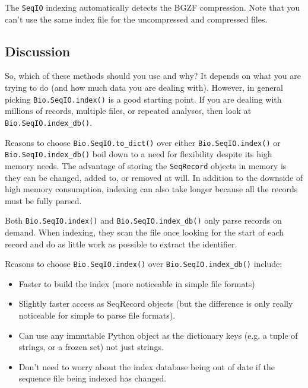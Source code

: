 The \verb|SeqIO| indexing automatically detects the BGZF compression. Note
that you can't use the same index file for the uncompressed and compressed files.

\subsection{Discussion}
\label{sec:SeqIO-indexing-discussion}

So, which of these methods should you use and why? It depends on what you are
trying to do (and how much data you are dealing with). However, in general
picking \verb|Bio.SeqIO.index()| is a good starting point. If you are dealing
with millions of records, multiple files, or repeated analyses, then look at
\verb|Bio.SeqIO.index_db()|.

Reasons to choose \verb|Bio.SeqIO.to_dict()| over either
\verb|Bio.SeqIO.index()| or \verb|Bio.SeqIO.index_db()| boil down to a need
for flexibility despite its high memory needs. The advantage of storing the
\verb|SeqRecord| objects in memory is they can be changed, added to, or
removed at will. In addition to the downside of high memory consumption,
indexing can also take longer because all the records must be fully parsed.

Both \verb|Bio.SeqIO.index()| and \verb|Bio.SeqIO.index_db()| only parse
records on demand. When indexing, they scan the file once looking for the
start of each record and do as little work as possible to extract the
identifier.

Reasons to choose \verb|Bio.SeqIO.index()| over \verb|Bio.SeqIO.index_db()|
include:
\begin{itemize}
\item Faster to build the index (more noticeable in simple file formats)
\item Slightly faster access as SeqRecord objects (but the difference is only
really noticeable for simple to parse file formats).
\item Can use any immutable Python object as the dictionary keys (e.g. a
tuple of strings, or a frozen set) not just strings.
\item Don't need to worry about the index database being out of date if the
sequence file being indexed has changed.
\end{itemize}

